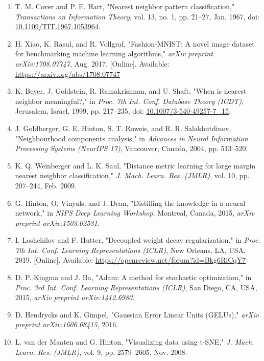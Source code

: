 \begin{enumerate}
\def\labelenumi{\arabic{enumi}.}
\tightlist
\item
  T. M. Cover and P. E. Hart, "Nearest neighbor pattern classification,"
  \emph{Transactions on Information Theory}, vol. 13, no. 1, pp. 21--27,
  Jan. 1967, doi:
  \href{https://doi.org/10.1109/TIT.1967.1053964}{10.1109/TIT.1967.1053964}.
\item
  H. Xiao, K. Rasul, and R. Vollgraf, "Fashion-MNIST: A novel image
  dataset for benchmarking machine learning algorithms," \emph{arXiv
  preprint arXiv:1708.07747}, Aug. 2017. {[}Online{]}. Available:
  \url{https://arxiv.org/abs/1708.07747}
\item
  K. Beyer, J. Goldstein, R. Ramakrishnan, and U. Shaft, "When is
  \textquotesingle nearest neighbor\textquotesingle{} meaningful?," in
  \emph{Proc. 7th Int. Conf. Database Theory (ICDT)}, Jerusalem, Israel,
  1999, pp. 217--235, doi:
  \href{https://doi.org/10.1007/3-540-49257-7_15}{10.1007/3-540-49257-7\_15}.
\item
  J. Goldberger, G. E. Hinton, S. T. Roweis, and R. R. Salakhutdinov,
  "Neighbourhood components analysis," in \emph{Advances in Neural
  Information Processing Systems (NeurIPS 17)}, Vancouver, Canada, 2004,
  pp. 513--520.
\item
  K. Q. Weinberger and L. K. Saul, "Distance metric learning for large
  margin nearest neighbor classification," \emph{J. Mach. Learn. Res.
  (JMLR)}, vol. 10, pp. 207--244, Feb. 2009.
\item
  G. Hinton, O. Vinyals, and J. Dean, "Distilling the knowledge in a
  neural network," in \emph{NIPS Deep Learning Workshop}, Montreal,
  Canada, 2015, \emph{arXiv preprint arXiv:1503.02531}.
\item
  I. Loshchilov and F. Hutter, "Decoupled weight decay regularization,"
  in \emph{Proc. 7th Int. Conf. Learning Representations (ICLR)}, New
  Orleans, LA, USA, 2019. {[}Online{]}. Available:
  \url{https://openreview.net/forum?id=Bkg6RiCqY7}
\item
  D. P. Kingma and J. Ba, "Adam: A method for stochastic optimization,"
  in \emph{Proc. 3rd Int. Conf. Learning Representations (ICLR)}, San
  Diego, CA, USA, 2015, \emph{arXiv preprint arXiv:1412.6980}.
\item
  D. Hendrycks and K. Gimpel, "Gaussian Error Linear Units (GELUs),"
  \emph{arXiv preprint arXiv:1606.08415}, 2016.
\item
  L. van der Maaten and G. Hinton, "Visualizing data using t-SNE,"
  \emph{J. Mach. Learn. Res. (JMLR)}, vol. 9, pp. 2579--2605, Nov. 2008.
\end{enumerate}
